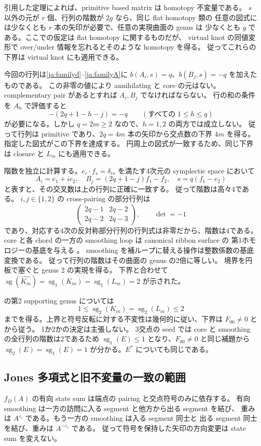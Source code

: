 \documentclass[12pt]{amsart}
\theoremstyle{definition}
\theoremstyle{remark}
\numberwithin{equation}{section}
\newcommand{\sg}{\operatorname{sg}}
\newcommand{\clK}[1]{\widehat{#1}}
\newcommand{\eps}{\varepsilon}
\begin{document}
引用した定理によれば、primitive based matrix は homotopy 不変量である。
$s$ 以外の元が $r$ 個、行列の階数が $2g$ なら、同じ flat homotopy 類の
任意の図式には少なくとも $r$ 本の矢印が必要で、任意の実現曲面の genus は
少なくとも $g$ である。ここでの仮定は flat homotopy に関するものだが、
virtual knot の同値変形で over/under 情報を忘れるとそのような homotopy を得る。
従ってこれらの下界は virtual knot にも適用できる。

今回の行列は\eqref{ja:familyd}--\eqref{ja:familyA}に
$b(A_i,s)=q$、$b(B_j,s)=-q$ を加えたものである。
この非零の値により annihilating と core の元はない。
complementary pair があるとすれば $A_i,B_j$ でなければならない。
行の和の条件を $A_h$ で評価すると
\[
-(2q+1-h-j)=-q\qquad(\text{すべての }1\le h\le q)
\]
が必要になる。しかし $q=2m\ge2$ なので、$h=1,2$ の両方では成立しない。
従って行列は primitive であり、$2q=4m$ 本の矢印から交点数の下界 $4m$ を得る。
指定した図式がこの下界を達成する。
円周上の図式が一致するため、同じ下界は closure と $L_m$ にも適用できる。

階数を独立に計算する。$e_r\cdot f_s=\delta_{rs}$ を満たす4次元の symplectic space において
\[
A_i=e_1+i e_2,\quad B_j=(2q+1-j)f_1-f_2,\quad s=q(f_1-e_2)
\]
と表すと、その交叉数は上の行列に正確に一致する。
従って階数は高々4である。
$i,j\in\{1,2\}$ の cross-pairing の部分行列は
\[
\begin{pmatrix}2q-1&2q-2\\2q-2&2q-3\end{pmatrix},\qquad\det=-1
\]
であり、対応する4次の反対称部分行列の行列式は非零だから、階数は4である。
core と各 chord の一方の smoothing loop は canonical ribbon surface の
第1ホモロジーの基底を与える \cite[\S4.2]{Turaev}。
smoothing を補ループに替える操作は整数係数の基底変換である。
従って行列の階数はその曲面の genus の2倍に等しい。
境界を円板で塞ぐと genus 2 の実現を得る。
下界と合わせて $\sg(\clK{K_m})=\sg_1(K_m)=\sg_1(L_m)=2$ が示された。

\cite[Definition 3.5]{NNSW2} の第2 supporting genus については
\[
1\le\sg_2(K_m)=\sg_2(L_m)\le2
\]
までを得る。上界と符号反転に対する不変性は幾何的に従い、下界は
$F_{00}\ne0$ と \cite[Lemma 3.6(ii)]{NNSW2} から従う。
1か2かの決定は主張しない。
3交点の seed では core と smoothing の全行列の階数は2であるため
$\sg_1(E)\le1$ となり、$F_{00}\ne0$ と同じ補題から
$\sg_2(E)=\sg_1(E)=1$ が分かる。$E^*$ についても同じである。

\subsection{Jones 多項式と旧不変量の一致の範囲}
$f_D(A)$ の有向 state sum は端点の pairing と交点符号のみに依存する。
有向 smoothing は一方の訪問に入る segment と他方から出る segment を結び、
重みは $A^{\eps_i}$ である。もう一方の smoothing は入る segment 同士と
出る segment 同士を結び、重みは $A^{-\eps_i}$ である。
従って符号を保持した矢印の方向変更は state sum を変えない。
\end{document}

